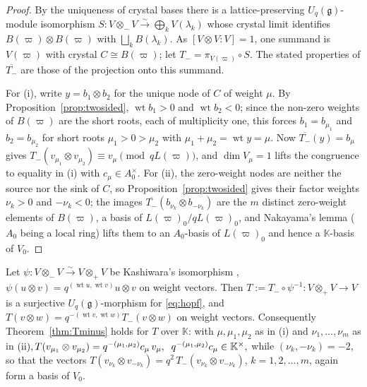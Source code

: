 \documentclass[12pt]{amsart}
\theoremstyle{plain}
\theoremstyle{remark}
\newcommand{\g}{\mathfrak{g}}
\newcommand{\Uq}{U_q(\g)}
\newcommand{\wt}{\operatorname{wt}}
\newcommand{\ot}{\otimes}
\newcommand{\vp}{\varpi}
\newcommand{\K}{\mathbb{K}}
\begin{document}
\begin{proof}
By the uniqueness of crystal bases \cite[Theorem 3]{Kashiwara} there is a
lattice-preserving $\Uq$-module isomorphism $S\colon V\ot_- V\xrightarrow{\sim}\bigoplus_k
V(\lambda_k)$ whose crystal limit identifies $B(\vp)\ot B(\vp)$ with
$\bigsqcup_k B(\lambda_k)$. As $[V\ot V:V]=1$, one summand is $V(\vp)$ with crystal
$C\cong B(\vp)$; let $T_-=\pi_{V(\vp)}\circ S$. The stated properties of $\overline{T_-}$ are
those of the projection onto this summand.

For (i), write $y=b_1\ot b_2$ for the unique node of $C$ of weight $\mu$. By
Proposition~\ref{prop:twosided}, $\wt b_1>0$ and $\wt b_2<0$; since the non-zero weights
of $B(\vp)$ are the short roots, each of multiplicity one, this forces
$b_1=b_{\mu_1}$ and $b_2=b_{\mu_2}$ for short roots $\mu_1>0>\mu_2$ with
$\mu_1+\mu_2=\wt y=\mu$. Now $\overline{T_-}(y)=b_\mu$ gives
$T_-(v_{\mu_1}\ot v_{\mu_2})\equiv v_\mu\pmod{qL(\vp)}$, and $\dim V_\mu=1$ lifts
the congruence to equality in (i) with $c_\mu\in A_0^\times$. For (ii), the zero-weight nodes are
neither the source nor the sink of $C$, so Proposition~\ref{prop:twosided} gives their
factor weights $\nu_k>0$ and $-\nu_k<0$; the images
$\overline{T_-}(b_{\nu_k}\ot b_{-\nu_k})$ are the $m$ distinct zero-weight
elements of $B(\vp)$, a basis of $L(\vp)_0/qL(\vp)_0$, and Nakayama's lemma ($A_0$
being a local ring) lifts them to an $A_0$-basis of $L(\vp)_0$ and hence a
$\K$-basis of $V_0$.
\end{proof}

Let $\psi\colon V\ot_- V\xrightarrow{\sim}V\ot_+ V$ be Kashiwara's isomorphism
\cite[(1.4.5)]{Kashiwara}, $\psi(u\ot v)=q^{(\wt u,\wt v)}u\ot v$ on
weight vectors. Then $T:=T_-\circ\psi^{-1}\colon V\ot_+ V\to V$ is a surjective
$\Uq$-morphism for \eqref{eq:hopf}, and $T(v\ot w)=q^{-(\wt v,\wt w)}T_-(v\ot w)$ on
weight vectors. Consequently Theorem~\ref{thm:Tminus} holds for $T$ over $\K$: with
$\mu,\mu_1,\mu_2$ as in {\rm(i)} and $\nu_1,\dots,\nu_m$ as in ${\rm(ii)}, T(v_{\mu_1}\ot v_{\mu_2})=q^{-(\mu_1,\mu_2)}c_\mu\,v_\mu, \;\;
q^{-(\mu_1,\mu_2)}c_\mu\in\K^\times,$
while $(\nu_k,-\nu_k)=-2$, so that the vectors
$T(v_{\nu_k}\ot v_{-\nu_k})=q^{2}\,T_-(v_{\nu_k}\ot v_{-\nu_k})$,
$k=1,2,\dots,m$, again form a basis of $V_0$.
\end{document}
